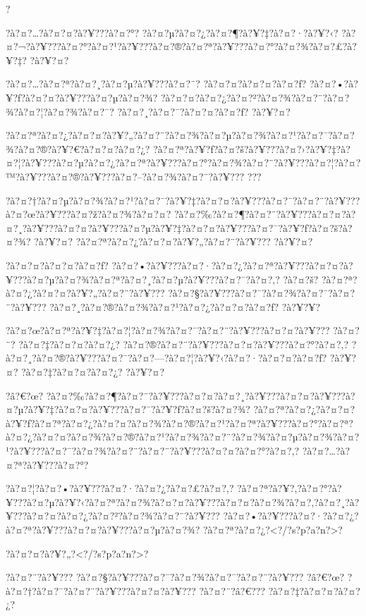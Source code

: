 \documentclass[11pt, openany]{book}
\begin{document}
{{{{{{{{{{?

?à?¤?\ldots{}?à?¤?¤?à?¥???à?¤?°? ?à?¤?µ?à?¤?¿?à?¤?¶?à?¥?‡?à?¤?·?à?¥?‹?
?à?¤?¬?à?¥???à?¤?°?à?¤?¹?à?¥???à?¤?®?à?¤?ª?à?¥???à?¤?°?à?¤?¾?à?¤?£?à?¥?‡?
?à?¥?¤?

?à?¤?\ldots{}?à?¤?ª?à?¤?¸?à?¤?µ?à?¥???à?¤?¯? ?à?¤?¤?à?¤?¤?à?¤?ƒ?
?à?¤?•?à?¥?ƒ?à?¤?¤?à?¥???à?¤?µ?à?¤?¾?
?à?¤?¤?à?¤?¿?à?¤?²?à?¤?¾?à?¤?¨?à?¤?¾?à?¤?¦?à?¤?¾?à?¤?¯?
?à?¤?¸?à?¤?¯?à?¤?¤?à?¤?ƒ? ?à?¥?¤?

?à?¤?ª?à?¤?¿?à?¤?¤?à?¥?„?à?¤?¨?à?¤?¾?à?¤?µ?à?¤?¾?à?¤?¹?à?¤?¯?à?¤?¾?à?¤?®?à?¥?€?à?¤?¤?à?¤?¿?
?à?¤?ª?à?¥?ƒ?à?¤?š?à?¥???à?¤?›?à?¥?‡?à?¤?¦?à?¥???à?¤?µ?à?¤?¿?à?¤?ª?à?¥???à?¤?°?à?¤?¾?à?¤?¨?à?¥???à?¤?¦?à?¤?™?à?¥???à?¤?®?à?¥???à?¤?--?à?¤?¾?à?¤?¨?à?¥???
?\textbar{}?\textbar{}?

?à?¤?†?à?¤?µ?à?¤?¾?à?¤?¹?à?¤?¯?à?¥?‡?à?¤?¤?à?¥???à?¤?¯?à?¤?¨?à?¥???à?¤?œ?à?¥???à?¤?ž?à?¤?¾?à?¤?¤?
?à?¤?‰?à?¤?¶?à?¤?¨?à?¥???à?¤?¤?à?¤?¸?à?¥???à?¤?¤?à?¥???à?¤?µ?à?¥?‡?à?¤?¤?à?¥???à?¤?¯?à?¥?ƒ?à?¤?š?à?¤?¾?
?à?¥?¤? ?à?¤?ª?à?¤?¿?à?¤?¤?à?¥?„?à?¤?¨?à?¥??? ?à?¥?¤?

?à?¤?¤?à?¤?¤?à?¤?ƒ?
?à?¤?•?à?¥???à?¤?·?à?¤?¿?à?¤?ª?à?¥???à?¤?¤?à?¥???à?¤?µ?à?¤?¾?à?¤?ª?à?¤?¸?à?¤?µ?à?¥???à?¤?¯?à?¤?‚?
?à?¤?š? ?à?¤?ª?à?¤?¿?à?¤?¤?à?¥?„?à?¤?¨?à?¥???
?à?¤?§?à?¥???à?¤?¯?à?¤?¾?à?¤?¯?à?¤?¨?à?¥???
?à?¤?¸?à?¤?®?à?¤?¾?à?¤?¹?à?¤?¿?à?¤?¤?à?¤?ƒ? ?à?¥?¥?

?à?¤?œ?à?¤?ª?à?¥?‡?à?¤?¦?à?¤?¾?à?¤?¯?à?¤?¨?à?¥???à?¤?¤?à?¥??? ?à?¤?¨?
?à?¤?‡?à?¤?¤?à?¤?¿? ?à?¤?®?à?¤?¨?à?¥???à?¤?¤?à?¥???à?¤?°?à?¤?‚?
?à?¤?¸?à?¤?®?à?¥???à?¤?¯?à?¤?---?à?¤?¦?à?¥?‹?à?¤?·?à?¤?¤?à?¤?ƒ? ?à?¥?¤?
?à?¤?‡?à?¤?¤?à?¤?¿? ?à?¥?¤?

?â?€?œ?
?à?¤?‰?à?¤?¶?à?¤?¨?à?¥???à?¤?¤?à?¤?¸?à?¥???à?¤?¤?à?¥???à?¤?µ?à?¥?‡?à?¤?¤?à?¥???à?¤?¯?à?¥?ƒ?à?¤?š?à?¤?¾?
?à?¤?ª?à?¤?¿?à?¤?¤?à?¥?ƒ?à?¤?ª?à?¤?¿?à?¤?¤?à?¤?¾?à?¤?®?à?¤?¹?à?¤?ª?à?¥???à?¤?°?à?¤?ª?à?¤?¿?à?¤?¤?à?¤?¾?à?¤?®?à?¤?¹?à?¤?¾?à?¤?¨?à?¤?¾?à?¤?µ?à?¤?¾?à?¤?¹?à?¥???à?¤?¯?à?¤?¾?à?¤?¨?à?¤?¨?à?¥???à?¤?¤?à?¤?°?à?¤?‚?
?à?¤?\ldots{}?à?¤?ª?à?¥???à?¤?°?

?à?¤?¦?à?¤?•?à?¥???à?¤?·?à?¤?¿?à?¤?£?à?¤?‚?
?à?¤?ª?à?¥?‚?à?¤?°?à?¥???à?¤?µ?à?¥?‹?à?¤?ª?à?¤?¾?à?¤?¤?à?¥???à?¤?¤?à?¤?¾?à?¤?‚?à?¤?¸?à?¥???à?¤?¤?à?¤?¿?à?¤?²?à?¤?¾?à?¤?¨?à?¥???
?à?¤?•?à?¥???à?¤?·?à?¤?¿?à?¤?ª?à?¥???à?¤?¤?à?¥???à?¤?µ?à?¤?¾?
?à?¤?ª?à?¤?¿?\textless{}?/?s?p?a?n?\textgreater{}?

?à?¤?¤?à?¥?„?\textless{}?/?s?p?a?n?\textgreater{}?

?à?¤?¨?à?¥??? ?à?¤?§?à?¥???à?¤?¯?à?¤?¾?à?¤?¯?à?¤?¨?à?¥??? ?â?€?œ?
?à?¤?†?à?¤?¯?à?¤?¨?à?¥???à?¤?¤?à?¥??? ?à?¤?¨?â?€??? ?à?¤?‡?à?¤?¤?à?¤?¿?

}}}}}}}}}}
\end{document}
